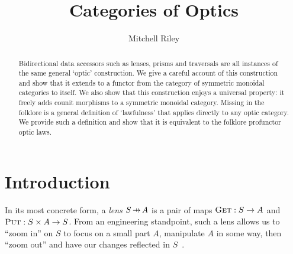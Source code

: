 \documentclass[11pt,letterpaper]{article}
\title{Categories of Optics}
\author{Mitchell Riley}
\affil{Wesleyan University \\ \texttt{mvriley@wesleyan.edu}}
\theoremstyle{plain}
\theoremstyle{definition}
\newcommand{\fget}{\textsc{Get}}
\newcommand{\fput}{\textsc{Put}}
\newcommand{\hto}{\ensuremath{\,\mathaccent\shortmid\rightarrow\,}}
\begin{document}
\maketitle

\begin{abstract}
Bidirectional data accessors such as lenses, prisms and traversals are all instances of the same general `optic' construction. We give a careful account of this construction and show that it extends to a functor from the category of symmetric monoidal categories to itself. We also show that this construction enjoys a universal property: it freely adds counit morphisms to a symmetric monoidal category. Missing in the folklore is a general definition of `lawfulness' that applies directly to any optic category. We provide such a definition and show that it is equivalent to the folklore profunctor optic laws.
\end{abstract}

\setcounter{tocdepth}{1}
\setlength\cftparskip{-8pt}
\tableofcontents
{}

\section{Introduction}

In its most concrete form, a \emph{lens} $S \hto A$ is a pair of maps ${\fget : S \to A}$ and ${\fput : S \times A \to S}$. From an engineering standpoint, such a lens allows us to ``zoom in'' on $S$ to focus on a small part $A$, manipulate $A$ in some way, then ``zoom out'' and have our changes reflected in $S$~\cite{CombinatorsForBidirectionalTreeTransformations}.
\end{document}
